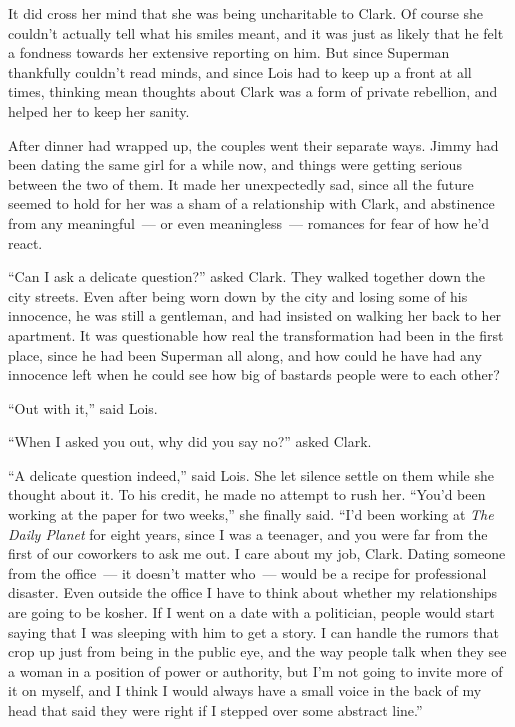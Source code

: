 It did cross her mind that she was being uncharitable to Clark. Of
course she couldn't actually tell what his smiles meant, and it was just
as likely that he felt a fondness towards her extensive reporting on
him. But since Superman thankfully couldn't read minds, and since Lois
had to keep up a front at all times, thinking mean thoughts about Clark
was a form of private rebellion, and helped her to keep her sanity.

After dinner had wrapped up, the couples went their separate ways. Jimmy
had been dating the same girl for a while now, and things were getting
serious between the two of them. It made her unexpectedly sad, since all
the future seemed to hold for her was a sham of a relationship with
Clark, and abstinence from any meaningful~--- or even meaningless~---
romances for fear of how he'd react.

``Can I ask a delicate question?'' asked Clark. They walked together
down the city streets. Even after being worn down by the city and losing
some of his innocence, he was still a gentleman, and had insisted on
walking her back to her apartment. It was questionable how real the
transformation had been in the first place, since he had been Superman
all along, and how could he have had any innocence left when he could
see how big of bastards people were to each other?

``Out with it,'' said Lois.

``When I asked you out, why did you say no?'' asked Clark.

``A delicate question indeed,'' said Lois. She let silence settle on
them while she thought about it. To his credit, he made no attempt to
rush her. ``You'd been working at the paper for two weeks,'' she finally
said. ``I'd been working at \emph{The Daily Planet} for eight years,
since I was a teenager, and you were far from the first of our coworkers
to ask me out. I care about my job, Clark. Dating someone from the
office~--- it doesn't matter who~--- would be a recipe for professional
disaster. Even outside the office I have to think about whether my
relationships are going to be kosher. If I went on a date with a
politician, people would start saying that I was sleeping with him to
get a story. I can handle the rumors that crop up just from being in the
public eye, and the way people talk when they see a woman in a position
of power or authority, but I'm not going to invite more of it on myself,
and I think I would always have a small voice in the back of my head
that said they were right if I stepped over some abstract line.''

